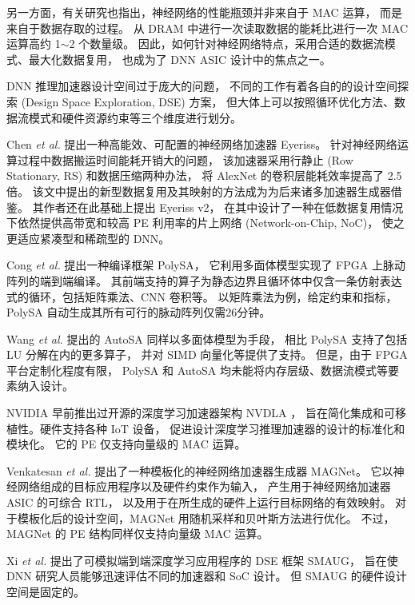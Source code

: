 另一方面，有关研究也指出，神经网络的性能瓶颈并非来自于 MAC 运算，
而是来自于数据存取的过程\cite{chen_diannao_2014}。
从 DRAM 中进行一次读取数据的能耗比进行一次 MAC 运算高约 1$\sim$2 个数量级。
因此，如何针对神经网络特点，采用合适的数据流模式、最大化数据复用，
也成为了 DNN ASIC 设计中的焦点之一\cite{chen_using_2017}。

DNN 推理加速器设计空间过于庞大的问题，
不同的工作有着各自的的设计空间探索 (Design Space Exploration, DSE) 方案，
但大体上可以按照循环优化方法、数据流模式和硬件资源约束等三个维度进行划分\cite{yang_interstellar_2020}。

Chen \textit{et al.}\cite{chen_eyeriss_2016}
提出一种高能效、可配置的神经网络加速器 Eyeriss。
针对神经网络运算过程中数据搬运时间能耗开销大的问题，
该加速器采用行静止 (Row Stationary, RS) 和数据压缩两种办法，
将 AlexNet 的卷积层能耗效率提高了 2.5 倍。
该文中提出的新型数据复用及其映射的方法成为为后来诸多加速器生成器借鉴。
其作者还在此基础上提出 Eyeriss v2\cite{chen_eyeriss_2019}，
在其中设计了一种在低数据复用情况下依然提供高带宽和较高 PE 利用率的片上网络 (Network-on-Chip, NoC)，
使之更适应紧凑型和稀疏型的 DNN。

Cong \textit{et al.}\cite{cong_polysa_2018} 
提出一种编译框架 PolySA，
它利用多面体模型实现了 FPGA 上脉动阵列的端到端编译。
其前端支持的算子为静态边界且循环体中仅含一条仿射表达式的循环，包括矩阵乘法、CNN 卷积等。
以矩阵乘法为例，给定约束和指标，PolySA 自动生成其所有可行的脉动阵列仅需26分钟。

Wang \textit{et al.}\cite{wang_autosa_2021} 
提出的 AutoSA 同样以多面体模型为手段，
相比 PolySA 支持了包括 LU 分解在内的更多算子，
并对 SIMD 向量化等提供了支持。
但是，由于 FPGA 平台定制化程度有限，
PolySA 和 AutoSA 均未能将内存层级、数据流模式等要素纳入设计。

NVIDIA 早前推出过开源的深度学习加速器架构 NVDLA \cite{nvidia_nvdla_2018}，
旨在简化集成和可移植性。硬件支持各种 IoT 设备，
促进设计深度学习推理加速器的设计的标准化和模块化。
它的 PE 仅支持向量级的 MAC 运算。

Venkatesan \textit{et al.}\cite{venkatesan_magnet_2019}
提出了一种模板化的神经网络加速器生成器 MAGNet。
它以神经网络组成的目标应用程序以及硬件约束作为输入，
产生用于神经网络加速器 ASIC 的可综合 RTL，
以及用于在所生成的硬件上运行目标网络的有效映射。
对于模板化后的设计空间，MAGNet 用随机采样和贝叶斯方法进行优化。
不过，MAGNet 的 PE 结构同样仅支持向量级 MAC 运算。

Xi \textit{et al.}\cite{xi_smaug_2020}
提出了可模拟端到端深度学习应用程序的 DSE 框架 SMAUG，
旨在使 DNN 研究人员能够迅速评估不同的加速器和 SoC 设计。
但 SMAUG 的硬件设计空间是固定的。

